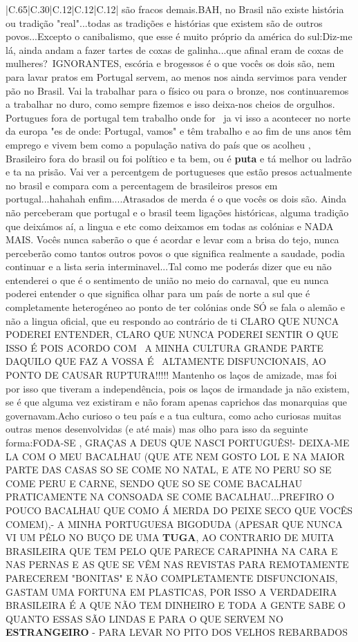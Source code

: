 \documentclass[11pt]{article}
\newlength\mylength
\begin{document}
\begin{center}
\begin{longtable}{|C{.65\mylength}|C{.30\mylength}|C{.12\mylength}|C{.12\mylength}|C{.12\mylength}|}
são fracos demais.BAH, no Brasil não existe história ou tradição "real"...todas as tradições e histórias que existem são de outros povos...Excepto o canibalismo, que esse é muito próprio da américa do sul:Diz-me lá, ainda andam a fazer tartes de coxas de galinha...que afinal eram de coxas de mulheres? IGNORANTES, escória e brogessos é o que vocês os dois são, nem para lavar pratos em Portugal servem, ao menos nos ainda servimos para vender pão no Brasil. Vai la trabalhar para o físico ou para o bronze, nos continuaremos a trabalhar no duro, como sempre fizemos e isso deixa-nos cheios de orgulhos. Portugues fora de portugal tem trabalho onde for  ja vi isso a acontecer no norte da europa "es de onde: Portugal, vamos" e têm trabalho e ao fim de uns anos têm emprego e vivem bem como a população nativa do país que os acolheu , Brasileiro fora do brasil ou foi político e ta bem, ou é \textbf{puta} e tá melhor ou ladrão e ta na prisão. Vai ver a percentgem de portugueses que estão presos actualmente no brasil e compara com a percentagem de brasileiros presos em portugal...hahahah enfim....Atrasados de merda é o que vocês os dois são. Ainda não perceberam que portugal e o brasil teem ligações históricas, alguma tradição que deixámos aí, a lingua e etc como deixamos em todas as colónias e NADA MAIS. Vocês nunca saberão o que é acordar e levar com a brisa do tejo, nunca perceberão como tantos outros povos o que significa realmente a saudade, podia continuar e a lista seria interminavel...Tal como me poderás dizer que eu não entenderei o que é o sentimento de união no meio do carnaval, que eu nunca poderei entender o que significa olhar para um país de norte a sul que é completamente heterogéneo ao ponto de ter colónias onde SÓ se fala o alemão e não a lingua oficial, que eu respondo ao contrário de ti CLARO QUE NUNCA PODEREI ENTENDER, CLARO QUE NUNCA PODEREI SENTIR O QUE ISSO É POIS ACORDO COM  A MINHA CULTURA GRANDE PARTE DAQUILO QUE FAZ A VOSSA É  ALTAMENTE DISFUNCIONAIS, AO PONTO DE CAUSAR RUPTURA!!!!! Mantenho os laços de amizade, mas foi por isso que tiveram a independência, pois os laços de irmandade ja não existem, se é que alguma vez existiram e não foram apenas caprichos das monarquias que governavam.Acho curioso o teu país e a tua cultura, como acho curiosas muitas outras menos desenvolvidas (e até mais) mas olho para isso da seguinte forma:FODA-SE , GRAÇAS A DEUS QUE NASCI PORTUGUÊS!- DEIXA-ME LA COM O MEU BACALHAU (QUE ATE NEM GOSTO LOL E NA MAIOR PARTE DAS CASAS SO SE COME NO NATAL, E ATE NO PERU SO SE COME PERU E CARNE, SENDO QUE SO SE COME BACALHAU PRATICAMENTE NA CONSOADA SE COME BACALHAU...PREFIRO O POUCO BACALHAU QUE COMO Á MERDA DO PEIXE SECO QUE VOCÊS COMEM),- A MINHA PORTUGUESA BIGODUDA (APESAR QUE NUNCA VI UM PÊLO NO BUÇO DE UMA \textbf{TUGA}, AO CONTRARIO DE MUITA BRASILEIRA QUE TEM PELO QUE PARECE CARAPINHA NA CARA E NAS PERNAS E AS QUE SE VÊM NAS REVISTAS PARA REMOTAMENTE PARECEREM "BONITAS" E NÃO COMPLETAMENTE DISFUNCIONAIS, GASTAM UMA FORTUNA EM PLASTICAS, POR ISSO A VERDADEIRA BRASILEIRA É A QUE NÃO TEM DINHEIRO E TODA A GENTE SABE O QUANTO ESSAS SÃO LINDAS E PARA O QUE SERVEM NO \textbf{ESTRANGEIRO} - PARA LEVAR NO PITO DOS VELHOS REBARBADOS 
\end{longtable}
\end{center}
\end{document}
